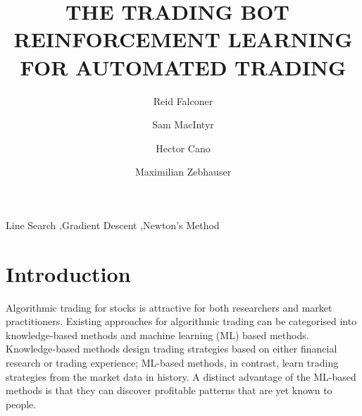 \documentclass[12pt, authoryear]{elsarticle}
\begin{document}
	
	\begin{frontmatter}  %
		
		\title{THE TRADING BOT\ \vspace{0.5cm} \large \\
			REINFORCEMENT LEARNING FOR AUTOMATED TRADING
		}
		
		\author[Add1]{Reid Falconer}
		
		\author[Add1]{Sam MacIntyr}
		
		\author[Add1]{Hector Cano}

		\author[Add1]{Maximilian Zebhauser}

		
		\address[Add1]{Barcelona Graduate School of Economics, Barcelona, Spain}
		
		
		
		
		\begin{keyword}
			\footnotesize{
				Line Search \sep  Gradient Descent \sep Newton's Method \\ \vspace{0.3cm}
			}
		\end{keyword}
		\vspace{0.5cm}
	\end{frontmatter}
	
	\headsep 25pt %

\section{Introduction}
Algorithmic trading for stocks is attractive for both researchers and market practitioners. Existing approaches for algorithmic trading can be categorised into knowledge-based methods and machine learning (ML) based methods. Knowledge-based methods design trading strategies based on either financial research or trading experience; ML-based methods, in contrast, learn trading strategies from the market data in history. A distinct advantage of the ML-based methods is that they can discover profitable patterns that are yet known to people. 
\end{document}

